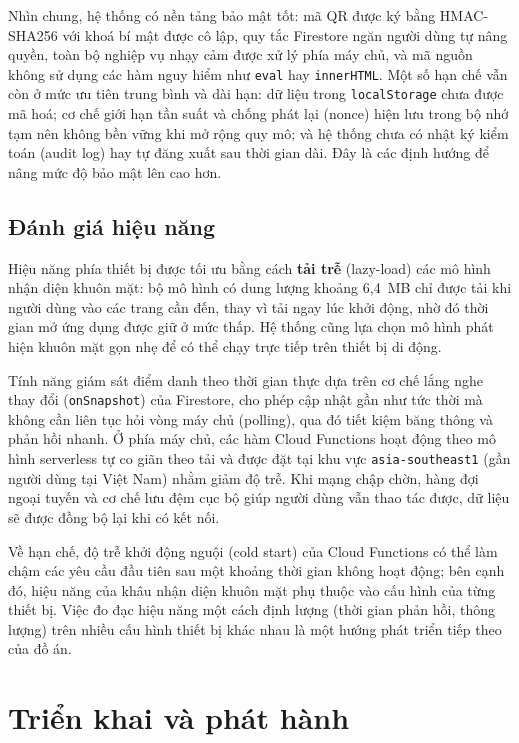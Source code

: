 \documentclass[../main.tex]{subfiles}
\begin{document}
Nhìn chung, hệ thống có nền tảng bảo mật tốt: mã QR được ký bằng HMAC-SHA256 với khoá bí mật
được cô lập, quy tắc Firestore ngăn người dùng tự nâng quyền, toàn bộ nghiệp vụ nhạy cảm được
xử lý phía máy chủ, và mã nguồn không sử dụng các hàm nguy hiểm như \texttt{eval} hay
\texttt{innerHTML}. Một số hạn chế vẫn còn ở mức ưu tiên trung bình và dài hạn: dữ liệu trong
\texttt{localStorage} chưa được mã hoá; cơ chế giới hạn tần suất và chống phát lại (nonce) hiện
lưu trong bộ nhớ tạm nên không bền vững khi mở rộng quy mô; và hệ thống chưa có nhật ký kiểm
toán (audit log) hay tự đăng xuất sau thời gian dài. Đây là các định hướng để nâng mức độ bảo
mật lên cao hơn.

\subsection{Đánh giá hiệu năng}
\label{sec:hieu-nang}

Hiệu năng phía thiết bị được tối ưu bằng cách \textbf{tải trễ} (lazy-load) các mô hình nhận
diện khuôn mặt: bộ mô hình có dung lượng khoảng 6{,}4~MB chỉ được tải khi người dùng vào các
trang cần đến, thay vì tải ngay lúc khởi động, nhờ đó thời gian mở ứng dụng được giữ ở mức
thấp. Hệ thống cũng lựa chọn mô hình phát hiện khuôn mặt gọn nhẹ để có thể chạy trực tiếp trên
thiết bị di động.

Tính năng giám sát điểm danh theo thời gian thực dựa trên cơ chế lắng nghe thay đổi
(\texttt{onSnapshot}) của Firestore, cho phép cập nhật gần như tức thời mà không cần liên tục
hỏi vòng máy chủ (polling), qua đó tiết kiệm băng thông và phản hồi nhanh. Ở phía máy chủ, các
hàm Cloud Functions hoạt động theo mô hình serverless tự co giãn theo tải và được đặt tại khu
vực \texttt{asia-southeast1} (gần người dùng tại Việt Nam) nhằm giảm độ trễ. Khi mạng chập
chờn, hàng đợi ngoại tuyến và cơ chế lưu đệm cục bộ giúp người dùng vẫn thao tác được, dữ liệu
sẽ được đồng bộ lại khi có kết nối.

Về hạn chế, độ trễ khởi động nguội (cold start) của Cloud Functions có thể làm chậm các yêu
cầu đầu tiên sau một khoảng thời gian không hoạt động; bên cạnh đó, hiệu năng của khâu nhận
diện khuôn mặt phụ thuộc vào cấu hình của từng thiết bị. Việc đo đạc hiệu năng một cách định
lượng (thời gian phản hồi, thông lượng) trên nhiều cấu hình thiết bị khác nhau là một hướng
phát triển tiếp theo của đồ án.

\section{Triển khai và phát hành}
\label{sec:phat-hanh}
\end{document}
